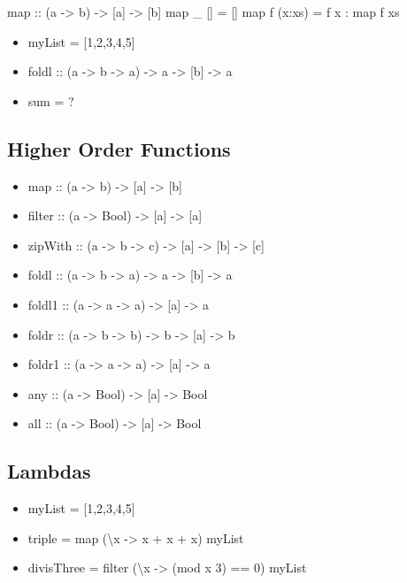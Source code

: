 \documentclass{beamer}                  %
\newcommand{\srule}{
	\rule{\textwidth}{1pt}\\
}
\newlength{\subsecwidth}
\newenvironment{slide}{
	\begin{frame} %
	\settowidth{\subsecwidth}{\insertsubsection} %
	\ifthenelse{\dimtest{\subsecwidth}{<}{1pt}}{ %
		\frametitle{\insertsection\\             %
		\vspace{-1ex}                            %
		\color{fore}\srule                       %
		\par                                     %
		\vspace{-3ex}                            %
		}
	}{                                           %
		\frametitle{\insertsection\ -- \insertsubsection\\ %
		\vspace{-1ex}                            %
		\color{fore}\srule                       %
		\par                                     %
		\vspace{-3ex}                            %
		}
	}
	\Large                                       %
}{
	\end{frame}
}
\begin{document}
\begin{slide}
  \begin{itemize}
    map :: (a -> b) -> [a] -> [b]
    map _ []     = []
    map f (x:xs) = f x : map f xs
  \end{itemize}
\end{slide}

\begin{slide}
  \begin{itemize}
    \item myList = [1,2,3,4,5]
    \item foldl :: (a -> b -> a) -> a -> [b] -> a
    \item sum = ?
  \end{itemize}
\end{slide}

\subsection{Higher Order Functions}

\begin{slide}
  \begin{itemize}
    \item map :: (a -> b) -> [a] -> [b]
    \item filter :: (a -> Bool) -> [a] -> [a]
    \item zipWith :: (a -> b -> c) -> [a] -> [b] -> [c]
    \item foldl :: (a -> b -> a) -> a -> [b] -> a
    \item foldl1 :: (a -> a -> a) -> [a] -> a
    \item foldr :: (a -> b -> b) -> b -> [a] -> b
    \item foldr1 :: (a -> a -> a) -> [a] -> a
    \item any :: (a -> Bool) -> [a] -> Bool
    \item all :: (a -> Bool) -> [a] -> Bool
  \end{itemize}
\end{slide}

\subsection{Lambdas}

\begin{slide}
  \begin{itemize}
    \item myList = [1,2,3,4,5]
    \item triple = map (\textbackslash x -> x + x + x) myList
    \item divisThree = filter (\textbackslash x -> (mod x 3) == 0) myList
  \end{itemize}
\end{slide}
\end{document}

